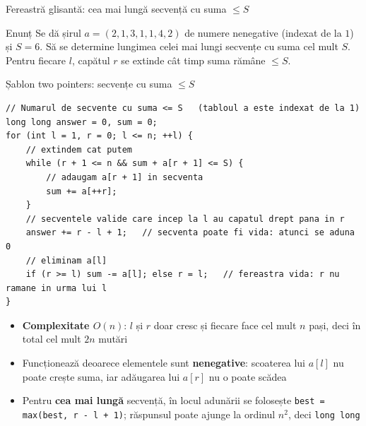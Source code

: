 \documentclass[8pt,mathserif]{beamer}
\newcommand{\winrow}[4]{%
  \foreach \v [count=\i from 0] in {2,1,3,1,1,4,2} {%
    \ifnum\i<#2\relax \tikzset{cs/.style={cellU,text=igNavy!35}}%
    \else\ifnum\i>#3\relax \tikzset{cs/.style={cellU,text=igNavy!35}}%
    \else \tikzset{cs/.style={cellW}}\fi\fi
    \node[cs] at (\i*0.6,-#1*0.6) {\v};}%
  \node[lab,font=\scriptsize] at (7*0.6-0.2,-#1*0.6) {#4};}
\begin{document}
\begin{frame}{Fereastră glisantă: cea mai lungă secvență cu suma $\le S$}
  \begin{exampleblock}{Enunț}
    Se dă șirul $a = (2,1,3,1,1,4,2)$ de numere nenegative (indexat de la $1$) și $S = 6$. Să se determine lungimea celei mai lungi secvențe cu suma cel mult $S$. Pentru fiecare $l$, capătul $r$ se extinde cât timp suma rămâne $\le S$.
  \end{exampleblock}
  \centering
\end{frame}

\begin{frame}[fragile]{Șablon two pointers: secvențe cu suma $\le S$}
  \begin{lstlisting}
// Numarul de secvente cu suma <= S   (tabloul a este indexat de la 1)
long long answer = 0, sum = 0;
for (int l = 1, r = 0; l <= n; ++l) {
    // extindem cat putem
    while (r + 1 <= n && sum + a[r + 1] <= S) {
        // adaugam a[r + 1] in secventa
        sum += a[++r];
    }
    // secventele valide care incep la l au capatul drept pana in r
    answer += r - l + 1;   // secventa poate fi vida: atunci se aduna 0
    // eliminam a[l]
    if (r >= l) sum -= a[l]; else r = l;   // fereastra vida: r nu ramane in urma lui l
}
  \end{lstlisting}
  \begin{itemize}
    \item \textbf{Complexitate $O(n)$}: $l$ și $r$ doar cresc și fiecare face cel mult $n$ pași, deci în total cel mult $2n$ mutări
    \item Funcționează deoarece elementele sunt \textbf{nenegative}: scoaterea lui $a[l]$ nu poate crește suma, iar adăugarea lui $a[r]$ nu o poate scădea
    \item Pentru \textbf{cea mai lungă} secvență, în locul adunării se folosește \texttt{best = max(best, r - l + 1)}; răspunsul poate ajunge la ordinul $n^2$, deci \texttt{long long}
  \end{itemize}
\end{frame}
\end{document}
